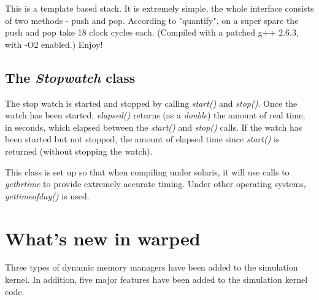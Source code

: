 \documentclass[11pt]{report}
\begin{document}
This is a template based stack.  It is extremely simple, the whole
interface consists of two methods - push and pop.  According to
"quantify", on a super sparc the push and pop take 18 clock cycles each.
(Compiled with a patched g++ 2.6.3, with -O2 enabled.)  Enjoy!

\section{The {\it Stopwatch} class}

The stop watch is started and stopped by calling {\it start()} and {\it
stop()}.  Once the watch has been started, {\it elapsed()} returns (as a
{\it double}) the amount of real time, in seconds, which elapsed between
the {\it start()} and {\it stop()} calls.  If the watch has been started
but not stopped, the amount of elapsed time since {\it start()} is
returned (without stopping the watch).
                                                                   
This class is set up so that when compiling under solaris, it will use
calls to {\it gethrtime} to provide extremely accurate timing.  Under
other operating systems, {\it gettimeofday()} is used.

\chapter{What's new in {\sc warped}}

Three types of dynamic memory managers have been added to the simulation
kernel. In addition, five major features have been added to the simulation
kernel code. 
\end{document}
